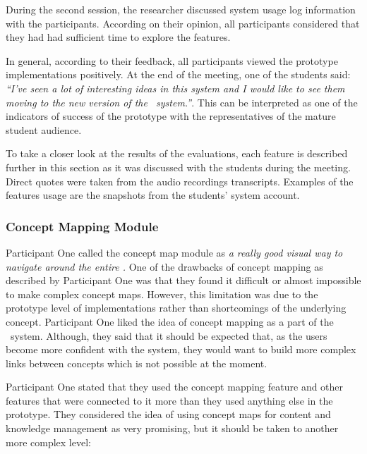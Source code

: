 During the second session, the researcher discussed system usage log information
with the participants. According on their opinion, all participants considered
that they had had sufficient time to explore the features. 

In general, according to their feedback, all participants viewed the prototype
implementations positively. At the end of the meeting, one of the students said:
\textit{``I've seen a lot of interesting ideas in this system and I would like
to see them moving to the new version of the \ep~system.''}. This can be
interpreted as one of the indicators of success of the prototype with the
representatives of the mature student audience.

To take a closer look at the results of the evaluations, each feature is
described further in this section as it was discussed with the students during
the meeting. Direct quotes were taken from the audio recordings transcripts.
Examples of the features usage are the snapshots from the students' system
account.

\subsubsection{Concept Mapping Module}

Participant One called the concept map module as \textit{a really good visual
way to navigate around the entire \ep.} One of the drawbacks of concept mapping
as described by Participant One was that they found it difficult or almost
impossible to make complex concept maps. However, this limitation was due to the
prototype level of implementations rather than shortcomings of the underlying
concept. Participant One liked the idea of concept mapping as a part of the
\ep~system. Although, they said that it should be expected that, as the users
become more confident with the system, they would want to build more complex
links between concepts which is not possible at the moment.

Participant One stated that they used the concept mapping feature and other
features that were connected to it more than they used anything else in the
prototype. They considered the idea of using concept maps for content and
knowledge management as very promising, but it should be taken to another more
complex level:


